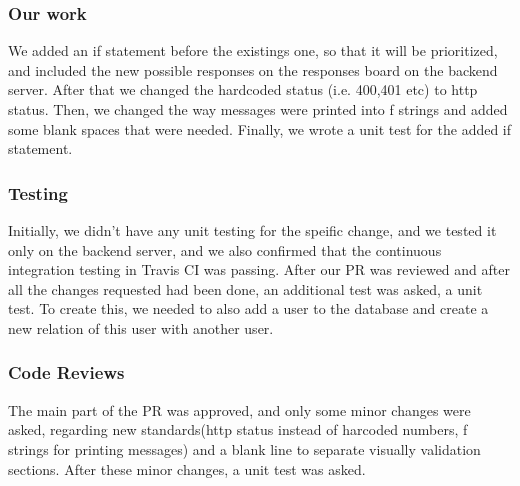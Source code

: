 \documentclass{article}
\begin{document}
\subsubsection{Our work}

We added an if statement before the existings one, so that it will be prioritized, and included the new possible responses on the responses board on the backend server. After that we changed the hardcoded status (i.e. 400,401 etc) to http status. Then, we changed the way messages were printed into f strings and added some blank spaces that were needed. Finally, we wrote a unit test for the added if statement.

\subsubsection{Testing}
Initially, we didn't have any unit testing for the speific change, and we tested it only on the backend server, and we also confirmed that the continuous integration testing in Travis CI was passing. 
After our PR was reviewed and after all the changes requested had been done, an additional test was asked, a unit test. To create this, we needed to also add a user to the database and create a new relation of this user with another user.

\subsubsection{Code Reviews}
The main part of the PR was approved, and only some minor changes were asked, regarding new standards(http status instead of harcoded numbers, f strings for printing messages) and a blank line to separate visually validation sections. After these minor changes, a unit test was asked.
\end{document}
